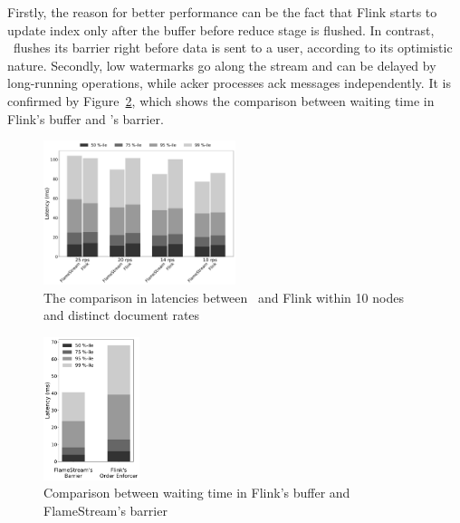Firstly, the reason for better performance can be the fact that Flink starts to update index only after the buffer before reduce stage is flushed. In contrast, \FlameStream\ flushes its barrier right before data is sent to a user, according to its optimistic nature. Secondly, low watermarks go along the stream and can be delayed by long-running operations, while acker processes ack messages independently. It is confirmed by Figure~\ref{buffer-vs-barrier}, which shows the comparison between waiting time in Flink's buffer and \FlameStream's barrier. 

\begin{figure}[htbp]
  \centering
  \includegraphics[width=0.5\textwidth]{pics/comp-index-quantiles}
  \caption{The comparison in latencies between \FlameStream\ and Flink within 10 nodes and distinct document rates}
  \label {fs-index-quantiles}
\end{figure}

\begin{figure}[htbp]
  \centering
  \includegraphics[width=0.25\textwidth]{pics/buffer-vs-barrier}
  \caption{Comparison between waiting time in Flink's buffer and FlameStream's barrier}
  \label {buffer-vs-barrier}
\end{figure}
